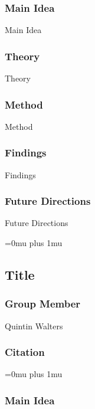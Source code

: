 \subsubsection{Main Idea}

\noindent
Main Idea

\subsubsection{Theory}

\noindent
Theory

\subsubsection{Method}

\noindent
Method

\subsubsection{Findings}

\noindent
Findings

\subsubsection{Future Directions}

\noindent
Future Directions 

\Urlmuskip=0mu plus 1mu\relax

\noindent
\subsection{Title}

\subsubsection{Group Member}

\noindent
Quintin Walters

\noindent
\subsubsection{Citation}

\Urlmuskip=0mu plus 1mu\relax

\subsubsection{Main Idea}

